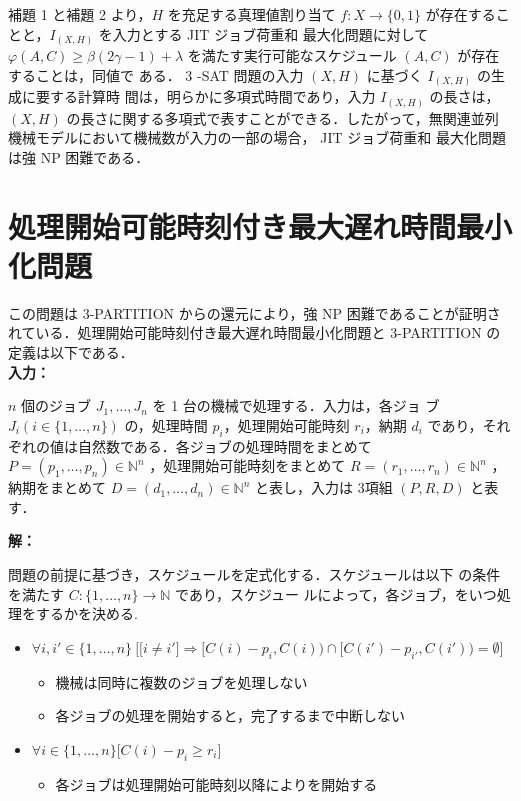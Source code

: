 \documentclass[12pt]{optlab-bachelor}
\begin{document}
補題 1 と補題 2 より，$H$ を充足する真理値割り当て $f : X \to \{0,
1\}$ が存在することと，$I_{(X,H)}$ を入力とする JIT ジョブ荷重和
最大化問題に対して $\varphi(A, C) \ge \beta(2\gamma − 1) + \lambda$
を満たす実行可能なスケジュール $(A, C)$ が存在することは，同値で
ある．
3 -SAT 問題の入力 $(X,H)$ に基づく $I_{(X,H)}$ の生成に要する計算時
間は，明らかに多項式時間であり，入力 $I_{(X,H)}$ の長さは，$(X, H)$
の長さに関する多項式で表すことができる．したがって，無関連並列
機械モデルにおいて機械数が入力の一部の場合， JIT ジョブ荷重和
最大化問題は強 NP 困難である．

\section{処理開始可能時刻付き最大遅れ時間最小化問題} %
この問題は 3-PARTITION からの還元により，強 NP 困難であることが証明さ
れている．処理開始可能時刻付き最大遅れ時間最小化問題と 3-PARTITION の
定義は以下である．\\

\noindent \textbf{入力：}

$n$ 個のジョブ $J_1,\ldots,J_n$ を 1 台の機械で処理する．入力は，各ジョ
ブ $J_i ( i \in \{1,\ldots,n\} )$ の，処理時間 $p_i$，処理開始可能時刻
$r_i$，納期 $d_i$ であり，それぞれの値は自然数である．各ジョブの処理時間をまとめて $P =
(p_1,\ldots,p_n) \in \mathbb{N}^n$ ，処理開始可能時刻をまとめて $R =
(r_1,\ldots,r_n) \in \mathbb{N}^n$ ，納期をまとめて $D =
(d_1,\ldots,d_n) \in \mathbb{N}^n$ と表し，入力は 3項組 $(P,R,D)$ と表
す．

\noindent \textbf{解：}

問題の前提に基づき，スケジュールを定式化する．スケジュールは以下
の条件を満たす $C : \{1,\ldots,n\} \to \mathbb{N}$ であり，スケジュー
ルによって，各ジョブ，をいつ処理をするかを決める.
\begin{itemize}
\item $\forall i, i' \in \{1,\ldots,n\}\ \Big[ \big[i \neq i' \big] \Rightarrow [C(i) - p_i, C(i)) \cap [C(i') - p_{i'}, C(i')) = \emptyset \Big]$
  \begin{itemize}
  \item 機械は同時に複数のジョブを処理しない
  \item 各ジョブの処理を開始すると，完了するまで中断しない
  \end{itemize}
\item  $\forall i \in \{1,\ldots,n\}\big[C(i) - p_i \ge r_i\big]$
  \begin{itemize}
  \item 各ジョブは処理開始可能時刻以降によりを開始する
  \end{itemize}
\end{itemize}
\end{document}
